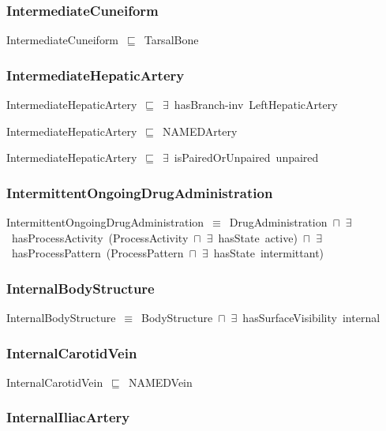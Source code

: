 \documentclass{article}
\begin{document}
\subsubsection*{IntermediateCuneiform}

IntermediateCuneiform~\ensuremath{\sqsubseteq}~TarsalBone~

\subsubsection*{IntermediateHepaticArtery}

IntermediateHepaticArtery~\ensuremath{\sqsubseteq}~\ensuremath{\exists}~hasBranch-inv~LeftHepaticArtery~

IntermediateHepaticArtery~\ensuremath{\sqsubseteq}~NAMEDArtery~

IntermediateHepaticArtery~\ensuremath{\sqsubseteq}~\ensuremath{\exists}~isPairedOrUnpaired~unpaired~

\subsubsection*{IntermittentOngoingDrugAdministration}

IntermittentOngoingDrugAdministration~\ensuremath{\equiv}~DrugAdministration~\ensuremath{\sqcap}~\ensuremath{\exists}~hasProcessActivity~(ProcessActivity~\ensuremath{\sqcap}~\ensuremath{\exists}~hasState~active)~\ensuremath{\sqcap}~\ensuremath{\exists}~hasProcessPattern~(ProcessPattern~\ensuremath{\sqcap}~\ensuremath{\exists}~hasState~intermittant)

\subsubsection*{InternalBodyStructure}

InternalBodyStructure~\ensuremath{\equiv}~BodyStructure~\ensuremath{\sqcap}~\ensuremath{\exists}~hasSurfaceVisibility~internal

\subsubsection*{InternalCarotidVein}

InternalCarotidVein~\ensuremath{\sqsubseteq}~NAMEDVein~

\subsubsection*{InternalIliacArtery}
\end{document}

